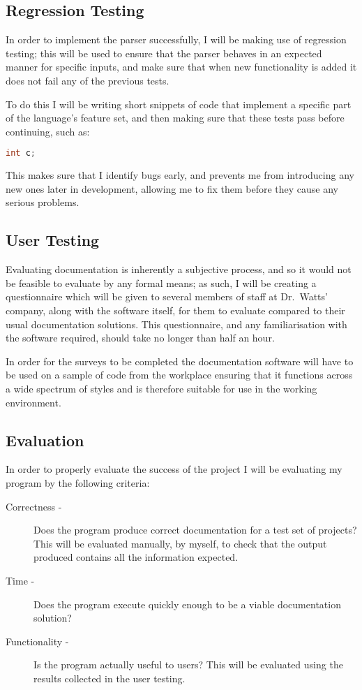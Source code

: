   \subsection{Regression Testing}
    In order to implement the parser successfully, I will be making use of
    regression testing; this will be used to ensure that the parser behaves
    in an expected manner for specific inputs, and make sure that when new
    functionality is added it does not fail any of the previous tests.

    To do this I will be writing short snippets of code that implement a
    specific part of the language's feature set, and then making sure that these
    tests pass before continuing, such as:

    \begin{lstlisting}[language=c, gobble=4]
      int c;
    \end{lstlisting}

    This makes sure that I identify bugs early, and prevents me from introducing
    any new ones later in development, allowing me to fix them before they cause
    any serious problems.

  \subsection{User Testing}
    Evaluating documentation is inherently a subjective process, and so it would
    not be feasible to evaluate by any formal means; as such, I will be creating
    a questionnaire which will be given to several members of staff at
    Dr.~Watts' company, along with the software itself, for them to evaluate
    compared to their usual documentation solutions. This questionnaire, and any
    familiarisation with the software required, should take no longer than half
    an hour.

    In order for the surveys to be completed the documentation software will
    have to be used on a sample of code from the workplace ensuring that it
    functions across a wide spectrum of styles and is therefore suitable for use
    in the working environment.

  \subsection{Evaluation}
    In order to properly evaluate the success of the project I will be
    evaluating my program by the following criteria:
    \begin{description}
      \item[Correctness -] Does the program produce correct documentation for
        a test set of projects? This will be evaluated manually, by myself, to
        check that the output produced contains all the information expected.
      \item[Time -] Does the program execute quickly enough to be a viable
        documentation solution?
      \item[Functionality -] Is the program actually useful to users? This will
        be evaluated using the results collected in the user testing.
    \end{description}


